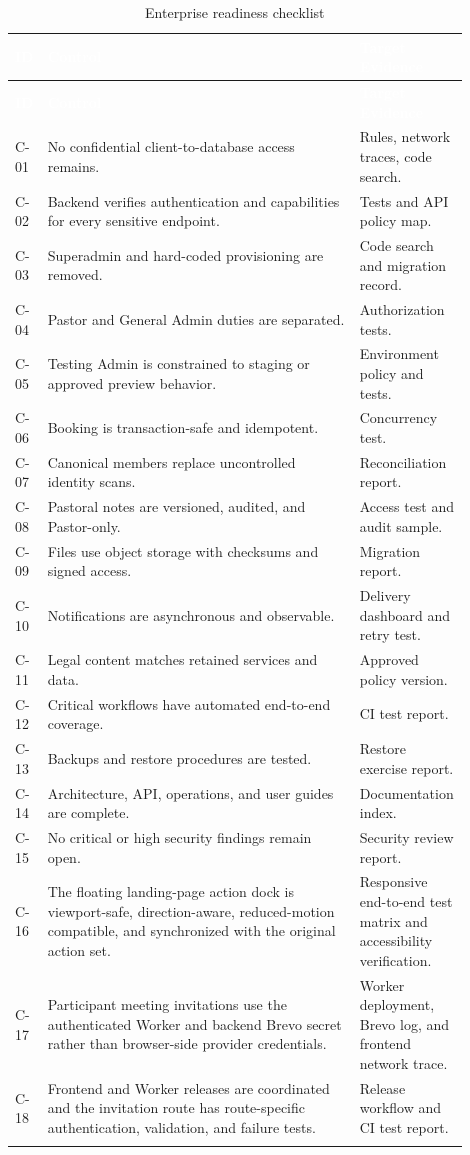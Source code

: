\documentclass[11pt,a4paper,oneside]{report}
\begin{document}
\begin{longtable}{@{}p{0.05\linewidth} p{0.68\linewidth} p{0.17\linewidth}@{}}
\toprule
\rowcolor{primary}
\textcolor{white}{\textbf{ID}} & \textcolor{white}{\textbf{Control}} & \textcolor{white}{\textbf{Target Evidence}} \\
\midrule
\endfirsthead
\toprule
\rowcolor{primary}
\textcolor{white}{\textbf{ID}} & \textcolor{white}{\textbf{Control}} & \textcolor{white}{\textbf{Target Evidence}} \\
\midrule
\endhead
C-01 & No confidential client-to-database access remains. & Rules, network traces, code search. \\
C-02 & Backend verifies authentication and capabilities for every sensitive endpoint. & Tests and API policy map. \\
C-03 & Superadmin and hard-coded provisioning are removed. & Code search and migration record. \\
C-04 & Pastor and General Admin duties are separated. & Authorization tests. \\
C-05 & Testing Admin is constrained to staging or approved preview behavior. & Environment policy and tests. \\
C-06 & Booking is transaction-safe and idempotent. & Concurrency test. \\
C-07 & Canonical members replace uncontrolled identity scans. & Reconciliation report. \\
C-08 & Pastoral notes are versioned, audited, and Pastor-only. & Access test and audit sample. \\
C-09 & Files use object storage with checksums and signed access. & Migration report. \\
C-10 & Notifications are asynchronous and observable. & Delivery dashboard and retry test. \\
C-11 & Legal content matches retained services and data. & Approved policy version. \\
C-12 & Critical workflows have automated end-to-end coverage. & CI test report. \\
C-13 & Backups and restore procedures are tested. & Restore exercise report. \\
C-14 & Architecture, API, operations, and user guides are complete. & Documentation index. \\
C-15 & No critical or high security findings remain open. & Security review report. \\
C-16 & The floating landing-page action dock is viewport-safe, direction-aware, reduced-motion compatible, and synchronized with the original action set. & Responsive end-to-end test matrix and accessibility verification. \\
C-17 & Participant meeting invitations use the authenticated Worker and backend Brevo secret rather than browser-side provider credentials. & Worker deployment, Brevo log, and frontend network trace. \\
C-18 & Frontend and Worker releases are coordinated and the invitation route has route-specific authentication, validation, and failure tests. & Release workflow and CI test report. \\
\bottomrule
\caption{Enterprise readiness checklist}
\end{longtable}
\end{document}

